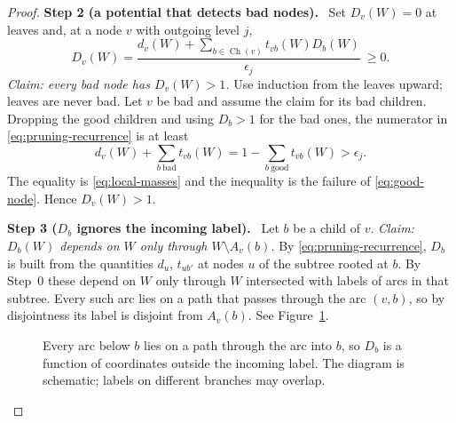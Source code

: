 \documentclass[11pt]{article}
\numberwithin{equation}{section}
\theoremstyle{remark}
\newcommand{\ch}{\operatorname{Ch}}
\newcommand{\step}[1]{\par\medskip\noindent\textbf{#1}\ }
\begin{document}
\begin{proof}
\step{Step 2 (a potential that detects bad nodes).} Set $D_v(W)=0$ at
leaves and, at a node $v$ with outgoing level $j$,
\begin{equation}\label{eq:pruning-recurrence}
 D_v(W)=\frac{d_v(W)+\sum_{b\in\ch(v)}t_{vb}(W)D_b(W)}{\epsilon_j}\ \ge0.
\end{equation}
\emph{Claim: every bad node has $D_v(W)>1$.} Use induction from the
leaves upward; leaves are never bad. Let $v$ be bad and assume the claim
for its bad children. Dropping the good children and using $D_b>1$ for
the bad ones, the numerator in \eqref{eq:pruning-recurrence} is at least
\[
 d_v(W)+\sum_{b\ \mathrm{bad}}t_{vb}(W)
 =1-\sum_{b\ \mathrm{good}}t_{vb}(W)>\epsilon_j .
\]
The equality is \eqref{eq:local-masses} and the inequality is the
failure of \eqref{eq:good-node}. Hence $D_v(W)>1$.

\step{Step 3 ($D_b$ ignores the incoming label).} Let $b$ be a child of
$v$. \emph{Claim: $D_b(W)$ depends on $W$ only through
$W\setminus A_v(b)$.} By \eqref{eq:pruning-recurrence}, $D_b$ is built
from the quantities $d_u$, $t_{ub'}$ at nodes $u$ of the subtree rooted
at $b$. By Step~0 these depend on $W$ only through $W$ intersected with
labels of arcs in that subtree. Every such arc lies on a path that
passes through the arc $(v,b)$, so by disjointness its label is
disjoint from $A_v(b)$. See Figure~\ref{fig:outside}.

\begin{figure}[!ht]
\centering
{}
\caption{Every arc below $b$ lies on a path through the arc into $b$, so
$D_b$ is a function of coordinates outside the incoming label. The
diagram is schematic; labels on different branches may overlap.}
\label{fig:outside}
\end{figure}


\end{proof}
\end{document}
